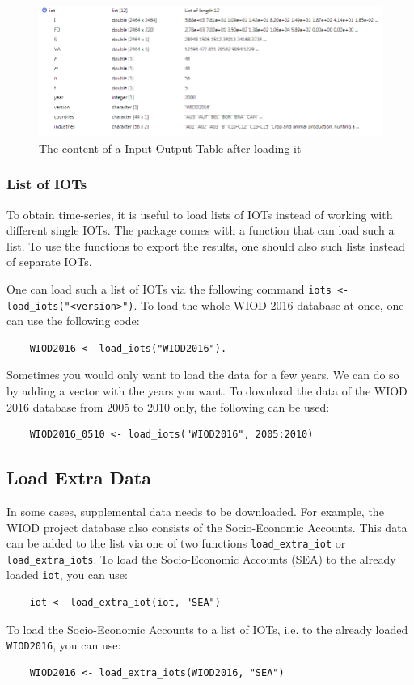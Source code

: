 \documentclass[10pt,a4paper]{paper}
\begin{document}
	\begin{figure}[t]
	\centering
	\includegraphics[width=\linewidth]{content_iot}
	\caption{The content of a Input-Output Table after loading it}
	\label{fig:contentiot}
	\end{figure}

	
	\subsubsection{List of IOTs}
	To obtain time-series, it is useful to load lists of IOTs instead of working with different single IOTs. The package comes with a function that can load such a list. To use the functions to export the results, one should also such lists instead of separate IOTs.
	
	One can load such a list of IOTs via the following command \texttt{iots <- load\_iots("<version>")}. To load the whole WIOD 2016 database at once, one can use the following code:
	\begin{Verbatim}
	WIOD2016 <- load_iots("WIOD2016").
	\end{Verbatim}
	Sometimes you would only want to load the data for a few years. We can do so by adding a vector with the years you want. To download the data of the WIOD 2016 database from 2005 to 2010 only, the following can be used:
	\begin{Verbatim}
	WIOD2016_0510 <- load_iots("WIOD2016", 2005:2010)
	\end{Verbatim}
	
	\subsection{Load Extra Data}
	In some cases, supplemental data needs to be downloaded. For example, the WIOD project database also consists of the Socio-Economic Accounts. This data can be added to the list via one of two functions \texttt{load\_extra\_iot} or \texttt{load\_extra\_iots}. To load the Socio-Economic Accounts (SEA) to the already loaded \texttt{iot}, you can use:
	\begin{Verbatim}
	iot <- load_extra_iot(iot, "SEA")
	\end{Verbatim} 
	To load the Socio-Economic Accounts to a list of IOTs, i.e. to the already loaded \texttt{WIOD2016}, you can use:
	\begin{Verbatim}
	WIOD2016 <- load_extra_iots(WIOD2016, "SEA")
	\end{Verbatim}
	
\end{document}

